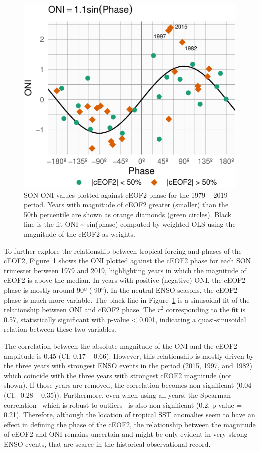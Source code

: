 \documentclass[pdflatex,lineno,sn-basic]{sn-jnl}
\theoremstyle{thmstyleone}%
\theoremstyle{thmstyletwo}%
\theoremstyle{thmstylethree}%
\begin{document}
\begin{figure}
\centering
\includegraphics{shceof_files/figure-latex/enso-phase-1.pdf}
\caption{\label{fig:enso-phase}SON ONI values plotted against cEOF2 phase for the 1979 -- 2019 period. Years with magnitude of cEOF2 greater (smaller) than the 50th percentile are shown as orange diamonds (green circles). Black line is the fit ONI \textasciitilde{} sin(phase) computed by weighted OLS using the magnitude of the cEOF2 as weights.}
\end{figure}

To further explore the relationship between tropical forcing and phases of the cEOF2, Figure~\ref{fig:enso-phase} shows the ONI plotted against the cEOF2 phase for each SON trimester between 1979 and 2019, highlighting years in which the magnitude of cEOF2 is above the median.
In years with positive (negative) ONI, the cEOF2 phase is mostly around 90º (-90°).
In the neutral ENSO seasons, the cEOF2 phase is much more variable.
The black line in Figure~\ref{fig:enso-phase} is a sinusoidal fit of the relationship between ONI and cEOF2 phase.
The \(r^2\) corresponding to the fit is 0.57, statistically significant with p-value \textless{} 0.001, indicating a quasi-sinusoidal relation between these two variables.

The correlation between the absolute magnitude of the ONI and the cEOF2 amplitude is 0.45 (CI: 0.17 -- 0.66).
However, this relationship is mostly driven by the three years with strongest ENSO events in the period (2015, 1997, and 1982) which coincide with the three years with strongest cEOF2 magnitude (not shown).
If those years are removed, the correlation becomes non-significant (0.04 (CI: -0.28 -- 0.35)).
Furthermore, even when using all years, the Spearman correlation --which is robust to outliers-- is also non-significant (0.2, p-value = 0.21).
Therefore, although the location of tropical SST anomalies seem to have an effect in defining the phase of the cEOF2, the relationship between the magnitude of cEOF2 and ONI remains uncertain and might be only evident in very strong ENSO events, that are scarce in the historical observational record.
\end{document}
